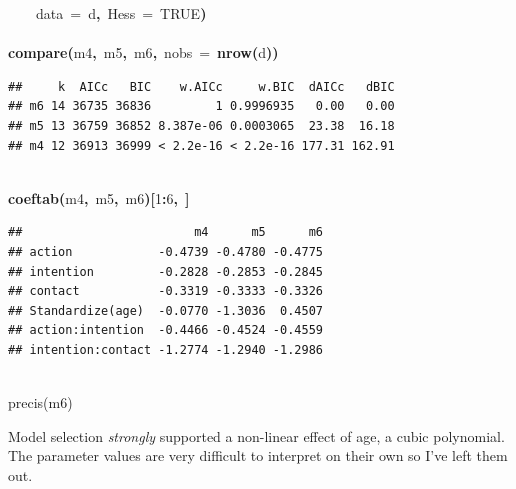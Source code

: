 \documentclass{article}
\makeatletter
\newcommand{\hlnumber}[1]{\textcolor[rgb]{0,0,0}{#1}}%
\newcommand{\hlfunctioncall}[1]{\textcolor[rgb]{.5,0,.33}{\textbf{#1}}}%
\newcommand{\hlkeyword}[1]{\textbf{#1}}%
\newcommand{\hlargument}[1]{\textcolor[rgb]{.69,.25,.02}{#1}}%
\newcommand{\hlcomment}[1]{\textcolor[rgb]{.18,.6,.34}{#1}}%
\newcommand{\hlsymbol}[1]{#1}%
\newcommand{\hlstd}[1]{\textcolor[rgb]{0,0,0}{#1}}%
\newenvironment{kframe}{%
 \def\FrameCommand##1{\hskip\@totalleftmargin \hskip-\fboxsep
 \colorbox{shadecolor}{##1}\hskip-\fboxsep
     \hskip-\linewidth \hskip-\@totalleftmargin \hskip\columnwidth}%
 \MakeFramed {\advance\hsize-\width
   \@totalleftmargin\z@ \linewidth\hsize
   \@setminipage}}%
 {\par\unskip\endMakeFramed}
\newenvironment{knitrout}{}{} %
\makeatother
\begin{document}
\begin{knitrout}
{\begin{kframe}
\begin{flushleft}
\hlstd{}{\ }{\ }{\ }{\ }\hlargument{data}{\ }\hlargument{=}{\ }\hlsymbol{d}\hlkeyword{,}{\ }\hlargument{Hess}{\ }\hlargument{=}{\ }\hlnumber{TRUE}\hlkeyword{)}\hspace*{\fill}\\
\hlstd{}\hspace*{\fill}\\
\hlstd{}\hlfunctioncall{compare}\hlkeyword{(}\hlsymbol{m4}\hlkeyword{,}{\ }\hlsymbol{m5}\hlkeyword{,}{\ }\hlsymbol{m6}\hlkeyword{,}{\ }\hlargument{nobs}{\ }\hlargument{=}{\ }\hlfunctioncall{nrow}\hlkeyword{(}\hlsymbol{d}\hlkeyword{)}\hlkeyword{)}\mbox{}
\normalfont
\end{flushleft}
\begin{verbatim}
##     k  AICc   BIC    w.AICc     w.BIC  dAICc   dBIC
## m6 14 36735 36836         1 0.9996935   0.00   0.00
## m5 13 36759 36852 8.387e-06 0.0003065  23.38  16.18
## m4 12 36913 36999 < 2.2e-16 < 2.2e-16 177.31 162.91
\end{verbatim}
\begin{flushleft}
\ttfamily\noindent
\hspace*{\fill}\\
\hlstd{}\hlfunctioncall{coeftab}\hlkeyword{(}\hlsymbol{m4}\hlkeyword{,}{\ }\hlsymbol{m5}\hlkeyword{,}{\ }\hlsymbol{m6}\hlkeyword{)}\hlkeyword{[}\hlnumber{1}\hlkeyword{:}\hlnumber{6}\hlkeyword{,}{\ }\hlkeyword{]}\mbox{}
\normalfont
\end{flushleft}
\begin{verbatim}
##                        m4      m5      m6
## action            -0.4739 -0.4780 -0.4775
## intention         -0.2828 -0.2853 -0.2845
## contact           -0.3319 -0.3333 -0.3326
## Standardize(age)  -0.0770 -1.3036  0.4507
## action:intention  -0.4466 -0.4524 -0.4559
## intention:contact -1.2774 -1.2940 -1.2986
\end{verbatim}
\begin{flushleft}
\ttfamily\noindent
\hspace*{\fill}\\
\hlstd{}\hlcomment{\usebox{\hlnormalsizeboxhash}precis(m6)}\mbox{}
\normalfont
\end{flushleft}
\end{kframe}}
\end{knitrout}


Model selection {\em strongly} supported a non-linear effect of age, a cubic polynomial.
The parameter values are very difficult to interpret on their own so I've left them out. 
\end{document}
